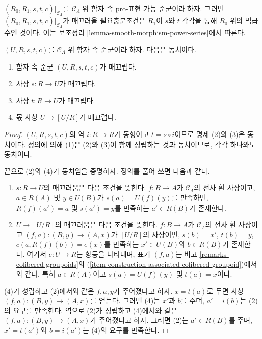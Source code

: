 \begin{remark}
\label{remark-smooth-power-series-prorepresentable-smooth-groupoid-in-functors}
$(\underline{R_0}, \underline{R_1}, s, t, c)|_{\mathcal{C}_\Lambda}$를
$\mathcal{C}_\Lambda$ 위 함자 속 pro-표현 가능 준군이라 하자. 그러면
$(\underline{R_0}, \underline{R_1}, s, t, c)|_{\mathcal{C}_\Lambda}$가
매끄러울 필요충분조건은 $R_1$이 $s$와 $t$ 각각을 통해 $R_0$ 위의
멱급수인 것이다. 이는 보조정리
\ref{lemma-smooth-morphism-power-series}에서 따른다.
\end{remark}

\begin{lemma}
\label{lemma-smooth-quotient-morphism}
$(U, R, s, t, c)$를 $\mathcal{C}_\Lambda$ 위 함자 속 준군이라 하자.
다음은 동치이다.
\begin{enumerate}
\item 함자 속 준군 $(U, R, s, t, c)$가 매끄럽다.
\item 사상 $s : R \to U$가 매끄럽다.
\item 사상 $t : R \to U$가 매끄럽다.
\item 몫 사상 $U \to [U/R]$가 매끄럽다.
\end{enumerate}
\end{lemma}

\begin{proof}
$(U, R, s, t, c)$의 역 $i: R \to R$가 동형이고
$t = s \circ i$이므로 명제 (2)와 (3)은 동치이다. 정의에 의해 (1)은
(2)와 (3)이 함께 성립하는 것과 동치이므로, 각각 하나와도 동치이다.

\medskip\noindent
끝으로 (2)와 (4)가 동치임을 증명하자. 정의를 풀어 쓰면 다음과 같다.
\begin{enumerate}
\item[(2)] $s: R \to U$의 매끄러움은 다음 조건을 뜻한다.
$f: B \to A$가 $\mathcal{C}_\Lambda$의 전사 환 사상이고,
$a \in R(A)$ 및 $y \in U(B)$가 $s(a) = U(f)(y)$를 만족하면,
$R(f)(a') = a$ 및 $s(a') = y$를 만족하는 $a' \in R(B)$가 존재한다.
\item[(4)] $U \to [U/R]$의 매끄러움은 다음 조건을 뜻한다.
$f: B \to A$가 $\mathcal{C}_\Lambda$의 전사 환 사상이고
$(f, a) : (B, y) \to (A, x)$가 $[U/R]$의 사상이면,
$s(b) = x'$, $t(b) = y$, $c(a, R(f)(b)) = e(x)$를 만족하는
$x' \in U(B)$와 $b \in R(B)$가 존재한다. 여기서
$e : U \to R$는 항등을 나타내며, 표기 $(f, a)$는 비고
\ref{remarks-cofibered-groupoids}의
(\ref{item-construction-associated-cofibered-groupoid})에서와 같다.
특히 $a \in R(A)$이고 $s(a) = U(f)(y)$ 및 $t(a) = x$이다.
\end{enumerate}
(4)가 성립하고 (2)에서와 같은 $f, a, y$가 주어졌다고 하자.
$x = t(a)$로 두면 사상 $(f, a): (B, y) \to (A, x)$를 얻는다.
그러면 (4)는 $x'$과 $b$를 주며, $a' = i(b)$는 (2)의 요구를 만족한다.
역으로 (2)가 성립하고 (4)에서와 같은
$(f, a): (B, y) \to (A, x)$가 주어졌다고 하자. 그러면 (2)는
$a' \in R(B)$를 주며, $x' = t(a')$와 $b = i(a')$는 (4)의 요구를
만족한다.
\end{proof}





